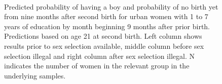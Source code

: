 \documentclass[12pt,letterpaper]{article}
\begin{document}
\begin{figure}[htpb]
{    \begin{minipage}{0.31\textwidth}
        \captionsetup[subfigure]{labelformat=empty,position=top,captionskip=-1pt,farskip=-0.5pt}
        \\
        \captionsetup[subfigure]{labelformat=parens}
    \end{minipage}
}
\setcounter{subfigure}{3}
\caption{Predicted probability of having a boy and probability of
no birth yet from nine months after second birth for urban 
women with 1 to 7 years of education by month beginning 9 months after prior birth. 
Predictions based on age 21 at second birth.
Left column shows results prior to sex selection available, middle column before
sex selection illegal and right column after sex selection illegal.
N indicates the number of women in the relevant group in the underlying samples.
}
\label{fig:results_spell3_med_urban}
\end{figure}
\end{document}
